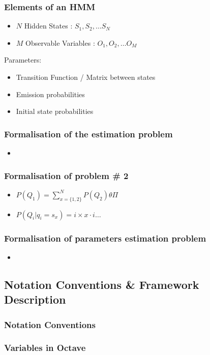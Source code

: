 \begin{frame}
  \frametitle{Elements of an HMM}
  \begin{itemize}
  \item $N$ Hidden States : $S_1,S_2, \ldots S_N$
  \item $M$ Observable Variables : $O_1, O_2, \ldots O_M$
  \end{itemize}
  Parameters:
  \begin{itemize}
  \item Transition Function / Matrix between states
  \item Emission probabilities
  \item Initial state probabilities
  \end{itemize}
\end{frame}
\begin{frame}
  \frametitle{Formalisation of the estimation problem}
  \begin{itemize}
  \item
  \end{itemize}
\end{frame}

\begin{frame}
  \frametitle{Formalisation of problem \# 2}
  \begin{itemize}
  \item $P(Q_1) = \displaystyle\sum_{x=\lbrace 1,2 \rbrace}^{N}P(Q_2) \theta\Pi$
  \item $P(Q_i \vert q_i = s_x) = i \times x \cdot i \ldots $
  \end{itemize}
\end{frame}

\begin{frame}
  \frametitle{Formalisation of parameters estimation problem}
  \begin{itemize}
  \item
  \end{itemize}
\end{frame}

\subsection{Notation Conventions \& Framework Description}
\label{sec:octave}

\begin{frame}
  \frametitle{Notation Conventions}

  
\end{frame}


\begin{frame}
  \frametitle{Variables in Octave}

  
\end{frame}
